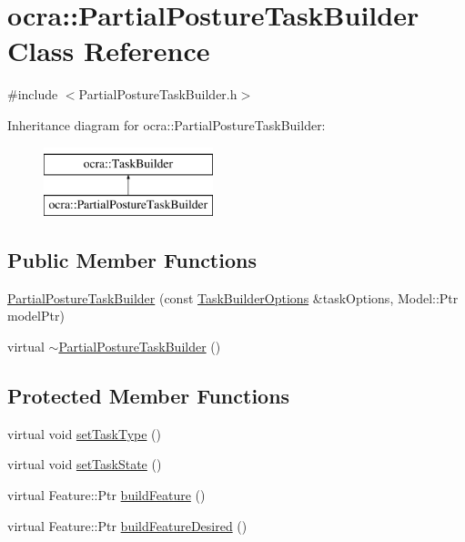 \hypertarget{classocra_1_1PartialPostureTaskBuilder}{}\section{ocra\+:\+:Partial\+Posture\+Task\+Builder Class Reference}
\label{classocra_1_1PartialPostureTaskBuilder}


{\ttfamily \#include $<$Partial\+Posture\+Task\+Builder.\+h$>$}

Inheritance diagram for ocra\+:\+:Partial\+Posture\+Task\+Builder\+:\begin{figure}[H]
\begin{center}
\leavevmode
\includegraphics[height=2.000000cm]{db/d7e/classocra_1_1PartialPostureTaskBuilder}
\end{center}
\end{figure}
\subsection*{Public Member Functions}
\begin{DoxyCompactItemize}
\item 
\hyperlink{classocra_1_1PartialPostureTaskBuilder_a4c8585a8722241b52a02ccb73bb3a675}{Partial\+Posture\+Task\+Builder} (const \hyperlink{classocra_1_1TaskBuilderOptions}{Task\+Builder\+Options} \&task\+Options, Model\+::\+Ptr model\+Ptr)
\item 
virtual \hyperlink{classocra_1_1PartialPostureTaskBuilder_a59c3cec0e4480654c360af17dc195b5a}{$\sim$\+Partial\+Posture\+Task\+Builder} ()
\end{DoxyCompactItemize}
\subsection*{Protected Member Functions}
\begin{DoxyCompactItemize}
\item 
virtual void \hyperlink{classocra_1_1PartialPostureTaskBuilder_acf2b5f880dc19e43356552b348d8a010}{set\+Task\+Type} ()
\item 
virtual void \hyperlink{classocra_1_1PartialPostureTaskBuilder_a70b416b1666a772940d96338a317af0a}{set\+Task\+State} ()
\item 
virtual Feature\+::\+Ptr \hyperlink{classocra_1_1PartialPostureTaskBuilder_ab4a80855ccc820bbeabf4eed87487784}{build\+Feature} ()
\item 
virtual Feature\+::\+Ptr \hyperlink{classocra_1_1PartialPostureTaskBuilder_a1a853459b32e838d04205459c608f5b2}{build\+Feature\+Desired} ()
\end{DoxyCompactItemize}
